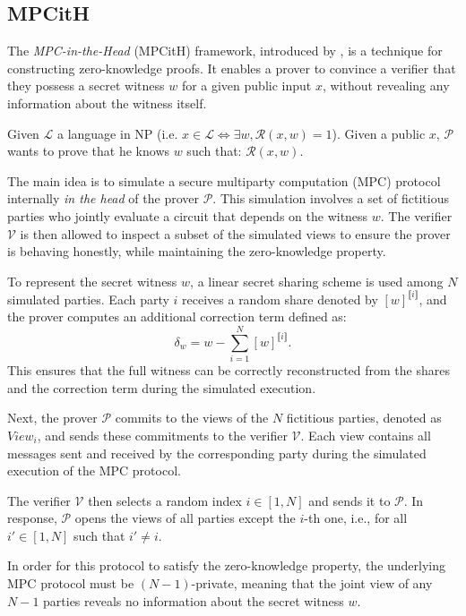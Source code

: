 \documentclass[english]{article}
\newcommand{\lir}{\llbracket i \rrbracket}
\begin{document}
		\subsection{MPCitH}
		
		The \emph{MPC-in-the-Head} (MPCitH) framework, introduced by \cite{IKOS07}, is a technique for constructing zero-knowledge proofs. It enables a prover to convince a verifier that they possess a secret witness $w$ for a given public input $x$, without revealing any information about the witness itself.
		
		Given $\mathcal{L}$ a language in NP (i.e. $x \in \mathcal{L} \Longleftrightarrow \exists w, \mathcal{R}(x, w) = 1$). Given a public $x$, $\mathcal{P}$ wants to prove that he knows $w$ such that: $\mathcal{R}(x, w)$.
		
		The main idea is to simulate a secure multiparty computation (MPC) protocol internally \textit{in the head} of the prover $\mathcal{P}$. This simulation involves a set of fictitious parties who jointly evaluate a circuit that depends on the witness $w$. The verifier $\mathcal{V}$ is then allowed to inspect a subset of the simulated views to ensure the prover is behaving honestly, while maintaining the zero-knowledge property.
		
		To represent the secret witness $w$, a linear secret sharing scheme is used among $N$ simulated parties. Each party $i$ receives a random share denoted by $[w]^{\lir}$, and the prover computes an additional correction term defined as:
		$$
		\delta_w = w - \sum_{i=1}^{N} [w]^{\lir}.
		$$
		This ensures that the full witness can be correctly reconstructed from the shares and the correction term during the simulated execution.
		
		Next, the prover $\mathcal{P}$ commits to the views of the $N$ fictitious parties, denoted as $View_i$, and sends these commitments to the verifier $\mathcal{V}$. Each view contains all messages sent and received by the corresponding party during the simulated execution of the MPC protocol.
		
		The verifier $\mathcal{V}$ then selects a random index $i \in [1, N]$ and sends it to $\mathcal{P}$. In response, $\mathcal{P}$ opens the views of all parties except the $i$-th one, i.e., for all $i' \in [1, N]$ such that $i' \neq i$.
		
		In order for this protocol to satisfy the zero-knowledge property, the underlying MPC protocol must be $(N-1)$-private, meaning that the joint view of any $N-1$ parties reveals no information about the secret witness $w$.
		
\end{document}
